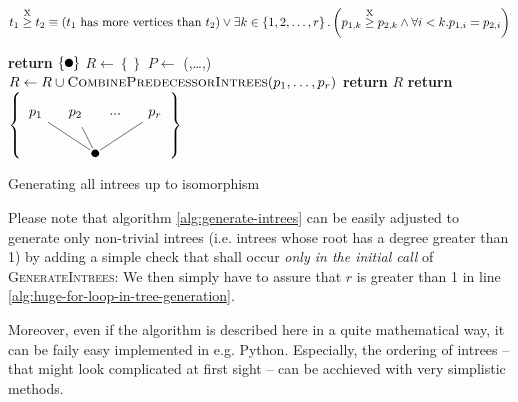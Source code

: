 \begin{equation}
  \label{eq:definition-treegeq}
  t_1 \stackrel{\text{X}}{\geq} t_2 \equiv (\text{$t_1$ has more vertices than $t_2$}) \vee \exists k \in \left\{ 1,2,\dots,r \right\}. \left( p_{1,k} \stackrel{\text{X}}{\geq} p_{2,k} \wedge \forall i<k. p_{1,i}=p_{2,i} \right)
\end{equation}

\begin{algorithm}
  \begin{algorithmic}[5]
     
        \State \textbf{return} $\left\{ \tikz{\fill(0,0) circle (0.1cm);} \right\}$ 
      \EndIf
      \State $R \gets \left\{  \right\}$ 
          \label{alg:huge-for-loop-in-tree-generation}
        \State $P \gets$ (,\dots,) 
           
          \State $R \gets R \cup \Call{CombinePredecessorIntrees}{p_1,\dots,p_r}$
          \EndIf
        \EndFor
      \EndFor
      \State \textbf{return} $R$
    \EndProcedure
    \Statex
    \State \textbf{return} $\left\{
      \tikz[baseline=(current bounding box.center)]{
        \fill (-0.5,0)circle(0.1cm);
        \node(root) at (-0.5,0){};
        \node[circle](1) at (-2,1) {$p_1$};
        \node[circle](2) at (-1,1) {$p_2$};
        \node[circle](p) at (0,1) {...};
        \node[circle](r) at (1,1) {$p_r$};
        \draw[-] (1) -- (root);
        \draw[-] (2) -- (root);
        \draw[-] (r) -- (root);
      }
      \right\} $
    \EndProcedure
  \end{algorithmic}
  \caption{Generating all intrees up to isomorphism}
  \label{alg:generate-intrees}
\end{algorithm}

Please note that algorithm \ref{alg:generate-intrees} can be easily adjusted to generate only non-trivial intrees (i.e. intrees whose root has a degree greater than 1) by adding a simple check that shall occur \emph{only in the initial call} of \textsc{GenerateIntrees}: We then simply have to assure that $r$ is greater than 1 in line \ref{alg:huge-for-loop-in-tree-generation}.

Moreover, even if the algorithm is described here in a quite mathematical way, it can be faily easy implemented in e.g. Python. Especially, the ordering of intrees -- that might look complicated at first sight -- can be acchieved with very simplistic methods.

